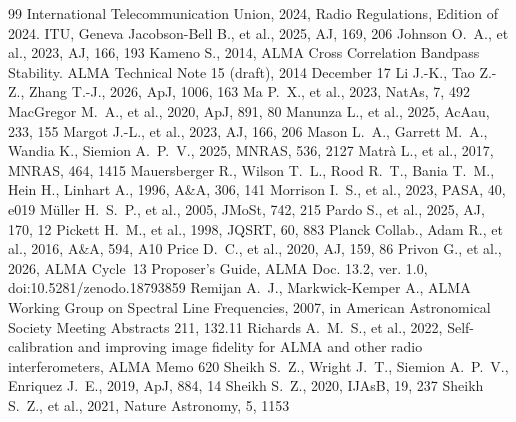 \documentclass[twocolumn,twocolappendix,numberedappendix,appendixfloats]{openjournal}
\begin{document}
\begin{thebibliography}{99}
 International Telecommunication Union, 2024, Radio Regulations, Edition of 2024. ITU, Geneva
 Jacobson-Bell B., et al., 2025, AJ, 169, 206
 Johnson O.~A., et al., 2023, AJ, 166, 193
 Kameno S., 2014, ALMA Cross Correlation Bandpass Stability. ALMA Technical Note 15 (draft), 2014 December 17
 Li J.-K., Tao Z.-Z., Zhang T.-J., 2026, ApJ, 1006, 163
 Ma P.~X., et al., 2023, NatAs, 7, 492
 MacGregor M.~A., et al., 2020, ApJ, 891, 80
 Manunza L., et al., 2025, AcAau, 233, 155
 Margot J.-L., et al., 2023, AJ, 166, 206
 Mason L.~A., Garrett M.~A., Wandia K., Siemion A.~P.~V., 2025, MNRAS, 536, 2127
 Matrà L., et al., 2017, MNRAS, 464, 1415
 Mauersberger R., Wilson T.~L., Rood R.~T., Bania T.~M., Hein H., Linhart A., 1996, A\&A, 306, 141
 Morrison I.~S., et al., 2023, PASA, 40, e019
 M\"uller H.~S.~P., et al., 2005, JMoSt, 742, 215
 Pardo S., et al., 2025, AJ, 170, 12
 Pickett H.~M., et al., 1998, JQSRT, 60, 883
 Planck Collab., Adam R., et al., 2016, A\&A, 594, A10
 Price D.~C., et al., 2020, AJ, 159, 86
 Privon G., et al., 2026, ALMA Cycle~13 Proposer's Guide, ALMA Doc. 13.2, ver. 1.0, doi:10.5281/zenodo.18793859
 Remijan A.~J., Markwick-Kemper A., ALMA Working Group on Spectral Line Frequencies, 2007, in American Astronomical Society Meeting Abstracts 211, 132.11
 Richards A.~M.~S., et al., 2022, Self-calibration and improving image fidelity for ALMA and other radio interferometers, ALMA Memo 620
 Sheikh S.~Z., Wright J.~T., Siemion A.~P.~V., Enriquez J.~E., 2019, ApJ, 884, 14
 Sheikh S.~Z., 2020, IJAsB, 19, 237
 Sheikh S.~Z., et al., 2021, Nature Astronomy, 5, 1153

\end{thebibliography}
\end{document}
